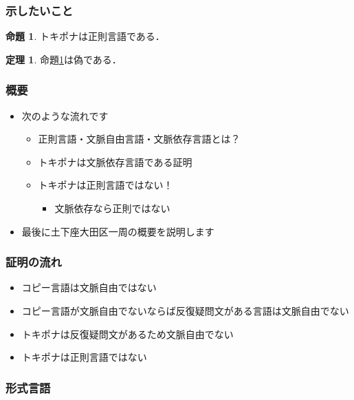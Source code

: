 \documentclass[14pt]{beamer}
\theoremstyle{definition}
\newtheorem{thm}{定理}
\newtheorem{prop}{命題}
\begin{document}
\begin{frame}
	\frametitle{示したいこと}

	\begin{tcolorbox}[
			colframe=orange!80,
			colback=orange!20,
			sharp corners]
		\begin{prop}\label{prop:pona}
			トキポナは正則言語である．
		\end{prop}

		\begin{thm}
			命題\ref{prop:pona}は偽である．
		\end{thm}
	\end{tcolorbox}

\end{frame}


\begin{frame}
	\frametitle{概要}

	\begin{itemize}
		\item 次のような流れです
			\begin{itemize}
				\item 正則言語・文脈自由言語・文脈依存言語とは？
				\item トキポナは文脈依存言語である証明
				\item トキポナは正則言語ではない！
					\begin{itemize}
						\item 文脈依存なら正則ではない
					\end{itemize}
			\end{itemize}
		\item 最後に土下座大田区一周の概要を説明します
	\end{itemize}

\end{frame}


\begin{frame}
	\frametitle{証明の流れ}

	\begin{itemize}
		\item コピー言語は文脈自由ではない
		\item コピー言語が文脈自由でないならば反復疑問文がある言語は文脈自由でない
		\item トキポナは反復疑問文があるため文脈自由でない
		\item トキポナは正則言語ではない
	\end{itemize}

\end{frame}


\begin{frame}
	\frametitle{形式言語}
\end{frame}
\end{document}
